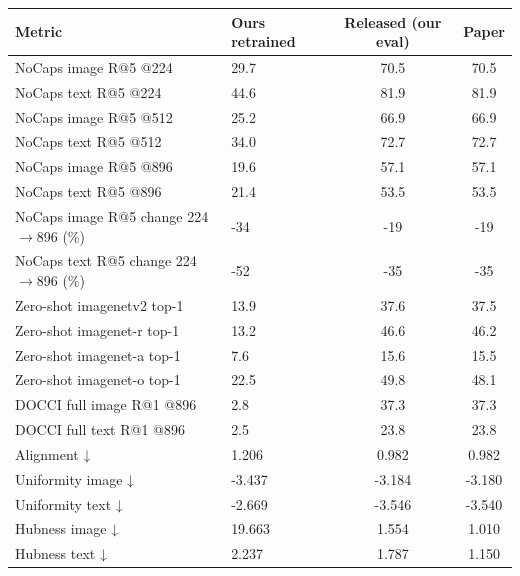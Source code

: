 \begin{tabular}{llcc}
\toprule
Metric & Ours retrained & Released (our eval) & Paper \\
\midrule
NoCaps image R@5 @224 & 29.7 & 70.5 & 70.5 \\
NoCaps text R@5 @224 & 44.6 & 81.9 & 81.9 \\
NoCaps image R@5 @512 & 25.2 & 66.9 & 66.9 \\
NoCaps text R@5 @512 & 34.0 & 72.7 & 72.7 \\
NoCaps image R@5 @896 & 19.6 & 57.1 & 57.1 \\
NoCaps text R@5 @896 & 21.4 & 53.5 & 53.5 \\
NoCaps image R@5 change 224$\to$896 (\%) & -34 & -19 & -19 \\
NoCaps text R@5 change 224$\to$896 (\%) & -52 & -35 & -35 \\
Zero-shot imagenetv2 top-1 & 13.9 & 37.6 & 37.5 \\
Zero-shot imagenet-r top-1 & 13.2 & 46.6 & 46.2 \\
Zero-shot imagenet-a top-1 & 7.6 & 15.6 & 15.5 \\
Zero-shot imagenet-o top-1 & 22.5 & 49.8 & 48.1 \\
DOCCI full image R@1 @896 & 2.8 & 37.3 & 37.3 \\
DOCCI full text R@1 @896 & 2.5 & 23.8 & 23.8 \\
Alignment ↓ & 1.206 & 0.982 & 0.982 \\
Uniformity image ↓ & -3.437 & -3.184 & -3.180 \\
Uniformity text ↓ & -2.669 & -3.546 & -3.540 \\
Hubness image ↓ & 19.663 & 1.554 & 1.010 \\
Hubness text ↓ & 2.237 & 1.787 & 1.150 \\
\bottomrule
\end{tabular}
